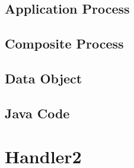 \documentclass{article}
\begin{document}
\begin{circusbox}

\end{circusbox}

\subsection{Application Process}

\begin{circusbox}

\end{circusbox}

\subsection{Composite Process}

\begin{circusbox}

\end{circusbox}

\subsection{Data Object}

\begin{circusbox}

\end{circusbox}

\subsection{Java Code}



\newpage


\section{Handler2}
\end{document}
